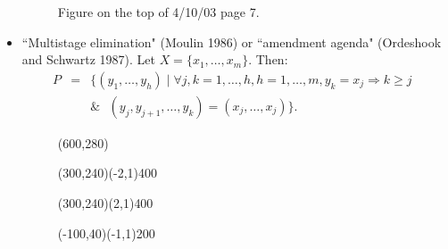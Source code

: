 \documentclass[12pt]{article}
\newcommand{\s}{\vspace{5mm}}
\begin{document}
\begin{itemize}
\begin{figure}[htb]
\begin{egame}
%



\end{egame}
\hspace*{\fill}\s\s\s\s\s\s\s\s\s\s\s\s\s
\caption[]{Figure on the top of 4/10/03 page 7.}\label{f:twelve}
\end{figure}

\item ``Multistage elimination" (Moulin 1986) or ``amendment agenda" (Ordeshook and Schwartz 1987).  Let $X=\{x_1,\hdots,x_m\}$.  Then:
\begin{eqnarray*}
P&=&\{(y_1,\hdots,y_h)\mid \forall j,k=1,\hdots,h, h=1,\hdots,m, y_k=x_j\Rightarrow k\geq j\mbox{ }\\
&&\&\mbox{ }(y_j,y_{j+1},\hdots,y_k)=(x_j,\hdots,x_j)\}.
\end{eqnarray*}

\begin{figure}[htb]
\hspace*{\fill}
\begin{egame}(600,280)

\renewcommand{\egarrowstyle}{}

\putbranch(300,240)(-2,1){400}

\renewcommand{\egarrowstyle}{}

\putbranch(300,240)(2,1){400}

\renewcommand{\egarrowstyle}{}

\putbranch(-100,40)(-1,1){200}


\end{egame}
\end{figure}
\end{itemize}
\end{document}
